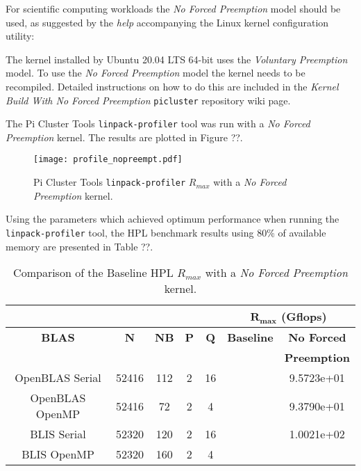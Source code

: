 For scientific computing workloads the \emph{No Forced Preemption} model should be used, as suggested by the \emph{help} accompanying the Linux kernel configuration utility:


The kernel installed by Ubuntu 20.04 LTS 64-bit uses the \emph{Voluntary Preemption} model. To use the \emph{No Forced Preemption} model the kernel needs to be recompiled. Detailed instructions on how to do this are included in the \emph{Kernel Build With No Forced Preemption} \verb|picluster| repository wiki page.

The Pi Cluster Tools \verb|linpack-profiler| tool was run with a \emph{No Forced Preemption} kernel. The results are plotted in Figure ??.

\begin{figure}[h]
	\centering
	\texttt{[image: profile\_nopreempt.pdf]}
	\caption{Pi Cluster Tools \texttt{linpack-profiler} $R_{max}$ with a \emph{No Forced Preemption} kernel.}
	\label{fig:subim1}
\end{figure}

Using the parameters which achieved optimum performance when running the \texttt{linpack-profiler} tool, the HPL benchmark results using 80\% of available memory are presented in Table ??. 

\begin{table}[H]
\begin{center}
\begin{tabular}{ |c|c|c|c|c|c|c| } 
\hline
\multicolumn{5}{|c}{} & \multicolumn{2}{|c|}{$\mathbf{R_{max}}$ \textbf{(Gflops)}} \\
\hline
\textbf{BLAS} & \textbf{N} & \textbf{NB} & \textbf{P} & \textbf{Q} & \textbf{Baseline}  & \textbf{No Forced}  \\
              &            &             &            &            &                    & \textbf{Preemption} \\
\hline
OpenBLAS Serial & 52416 & 112 & 2 & 16 &  & 9.5723e+01 \\
\hline
OpenBLAS OpenMP & 52416 &  72 & 2 &  4 &  & 9.3790e+01 \\
\hline
BLIS Serial     & 52320 & 120 & 2 & 16 &  & 1.0021e+02 \\
\hline
BLIS OpenMP     & 52320 & 160 & 2 &  4 &  &  \\
\hline
\end{tabular}
\end{center}
\caption{\label{tab:table-name}Comparison of the Baseline HPL $R_{max}$ with a \emph{No Forced Preemption} kernel.}
\end{table}

